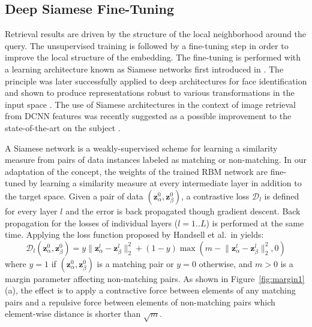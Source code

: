 \documentclass[10pt,twocolumn,letterpaper]{article}
\begin{document}
\subsection{Deep Siamese Fine-Tuning}

Retrieval results are driven by the structure of the local neighborhood around the query.
The unsupervised training is followed by a fine-tuning step in order to improve the local structure of the embedding.
The fine-tuning is performed with a learning architecture known as Siamese networks first introduced in \cite{siamesenetwork}.
The principle was later successfully applied to deep architectures for face identification \cite{chopra2005} and shown to produce representations robust to various transformations in the input space \cite{Siamese}.
The use of Siamese architectures in the context of image retrieval from DCNN features was recently suggested as a possible improvement to the state-of-the-art on the subject \cite{Yandex}. 

A Siamese network is a weakly-supervised scheme for learning a similarity measure from pairs of data instances labeled as matching or non-matching.
In our adaptation of the concept, the weights of the trained RBM network are fine-tuned by learning a similarity measure at every intermediate layer in addition to the target space.
Given a pair of data $(\mathbf{z}_\alpha^0,\mathbf{z}_\beta^0)$, a contrastive loss $\mathcal{D}_l$ is defined for every layer $l$ and the error is back propagated though gradient descent.
Back propagation for the losses of individual layers ($l = 1..L$) is performed at the same time.
Applying the loss function proposed by Handsell et al.~in \cite{Siamese} yields:
\begin{equation}
\label{eq:siamese1}
\mathcal{D}_l(\mathbf{z}_\alpha^0,\mathbf{z}_\beta^0) = y \lVert \mathbf{z}_\alpha^l - \mathbf{z}_\beta^l \rVert_2^2 + (1-y) \max(m - \lVert \mathbf{z}_\alpha^l - \mathbf{z}_\beta^l \rVert_2^2, 0)
\end{equation}
where $y=1$ if $(\mathbf{z}_\alpha^0,\mathbf{z}_\beta^0)$ is a matching pair or $y=0$ otherwise, and $m > 0$ is a margin parameter affecting non-matching pairs.
As shown in Figure~\ref{fig:margin1}(a), the effect is to apply a contractive force between elements of any matching pairs and a repulsive force between elements of non-matching pairs which element-wise distance is shorter than $\sqrt{m}$.
\end{document}
